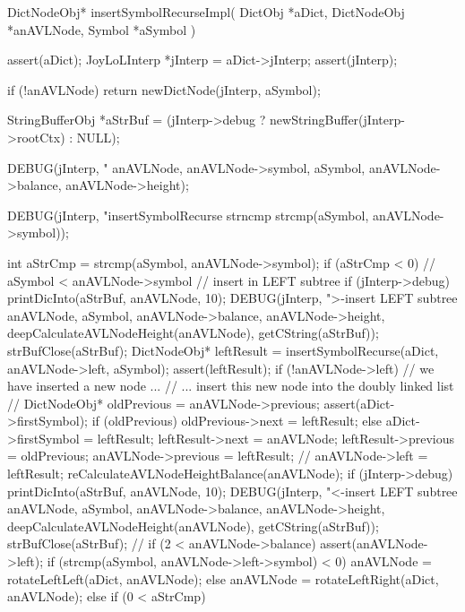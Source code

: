 DictNodeObj* insertSymbolRecurseImpl(
  DictObj     *aDict,
  DictNodeObj *anAVLNode,
  Symbol      *aSymbol
) {
  assert(aDict);
  JoyLoLInterp *jInterp = aDict->jInterp;
  assert(jInterp);
 
  if (!anAVLNode) return newDictNode(jInterp, aSymbol);

  StringBufferObj *aStrBuf =
    (jInterp->debug ? newStringBuffer(jInterp->rootCtx) : NULL);

  DEBUG(jInterp, "\ninsertSymbolRecurse %
        anAVLNode, anAVLNode->symbol, aSymbol,
        anAVLNode->balance, anAVLNode->height);

  DEBUG(jInterp, "insertSymbolRecurse strncmp %
        strcmp(aSymbol, anAVLNode->symbol));

  int aStrCmp = strcmp(aSymbol, anAVLNode->symbol);
  if (aStrCmp < 0) {
    // aSymbol < anAVLNode->symbol // insert in LEFT subtree
    if (jInterp->debug) {
      printDicInto(aStrBuf, anAVLNode, 10);
      DEBUG(jInterp, ">-insert LEFT subtree %
            anAVLNode, aSymbol, anAVLNode->balance,
            anAVLNode->height, deepCalculateAVLNodeHeight(anAVLNode),
            getCString(aStrBuf));
      strBufClose(aStrBuf);
    }
    DictNodeObj* leftResult =
      insertSymbolRecurse(aDict, anAVLNode->left, aSymbol);
    assert(leftResult);
    if (!anAVLNode->left) {
      // we have inserted a new node ...
      // ... insert this new node into the doubly linked list
      //
      DictNodeObj* oldPrevious           = anAVLNode->previous;
      assert(aDict->firstSymbol);
      if (oldPrevious) oldPrevious->next = leftResult;
      else aDict->firstSymbol            = leftResult;
      leftResult->next                   = anAVLNode;
      leftResult->previous               = oldPrevious;
      anAVLNode->previous                = leftResult;
      //
    }
    anAVLNode->left = leftResult;
    reCalculateAVLNodeHeightBalance(anAVLNode);
    if (jInterp->debug) {
      printDicInto(aStrBuf, anAVLNode, 10);
      DEBUG(jInterp, "<-insert LEFT subtree %
          anAVLNode, aSymbol, anAVLNode->balance,
          anAVLNode->height, deepCalculateAVLNodeHeight(anAVLNode),
          getCString(aStrBuf));
      strBufClose(aStrBuf);
    }
    //
    if (2 < anAVLNode->balance) {
      assert(anAVLNode->left);
      if (strcmp(aSymbol, anAVLNode->left->symbol) < 0) {
        anAVLNode = rotateLeftLeft(aDict, anAVLNode);
      } else {
        anAVLNode = rotateLeftRight(aDict, anAVLNode);
      }
    }
  } else if (0 < aStrCmp) {
}}
